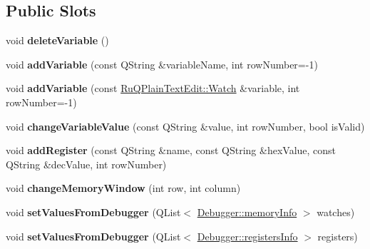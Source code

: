 \subsection*{Public Slots}
\begin{DoxyCompactItemize}
\item 
\hypertarget{class_debug_table_widget_a4d8800af67dcf41b00c9c99f7cf136dc}{}void {\bfseries delete\+Variable} ()\label{class_debug_table_widget_a4d8800af67dcf41b00c9c99f7cf136dc}

\item 
\hypertarget{class_debug_table_widget_a643c2921c5092af91a16bfea6246e96d}{}void {\bfseries add\+Variable} (const Q\+String \&variable\+Name, int row\+Number=-\/1)\label{class_debug_table_widget_a643c2921c5092af91a16bfea6246e96d}

\item 
\hypertarget{class_debug_table_widget_a09c0ea8ad8301fb33343855b8a1ceaea}{}void {\bfseries add\+Variable} (const \hyperlink{struct_ru_q_plain_text_edit_1_1_watch}{Ru\+Q\+Plain\+Text\+Edit\+::\+Watch} \&variable, int row\+Number=-\/1)\label{class_debug_table_widget_a09c0ea8ad8301fb33343855b8a1ceaea}

\item 
\hypertarget{class_debug_table_widget_a655c0e61ba8232d0ae3a06c5b83c8ab9}{}void {\bfseries change\+Variable\+Value} (const Q\+String \&value, int row\+Number, bool is\+Valid)\label{class_debug_table_widget_a655c0e61ba8232d0ae3a06c5b83c8ab9}

\item 
\hypertarget{class_debug_table_widget_a26bcee1edac0ec77e94a158bf460fdc0}{}void {\bfseries add\+Register} (const Q\+String \&name, const Q\+String \&hex\+Value, const Q\+String \&dec\+Value, int row\+Number)\label{class_debug_table_widget_a26bcee1edac0ec77e94a158bf460fdc0}

\item 
\hypertarget{class_debug_table_widget_a5ef2ed2a7b735973df658db91ca37fd2}{}void {\bfseries change\+Memory\+Window} (int row, int column)\label{class_debug_table_widget_a5ef2ed2a7b735973df658db91ca37fd2}

\item 
\hypertarget{class_debug_table_widget_acb9c92b66e566a16bb71fb68fb39cf5c}{}void {\bfseries set\+Values\+From\+Debugger} (Q\+List$<$ \hyperlink{struct_debugger_1_1memory_info}{Debugger\+::memory\+Info} $>$ watches)\label{class_debug_table_widget_acb9c92b66e566a16bb71fb68fb39cf5c}

\item 
\hypertarget{class_debug_table_widget_ab2631afd9b17c3f5246fad297b02c0b7}{}void {\bfseries set\+Values\+From\+Debugger} (Q\+List$<$ \hyperlink{struct_debugger_1_1registers_info}{Debugger\+::registers\+Info} $>$ registers)\label{class_debug_table_widget_ab2631afd9b17c3f5246fad297b02c0b7}

\end{DoxyCompactItemize}
